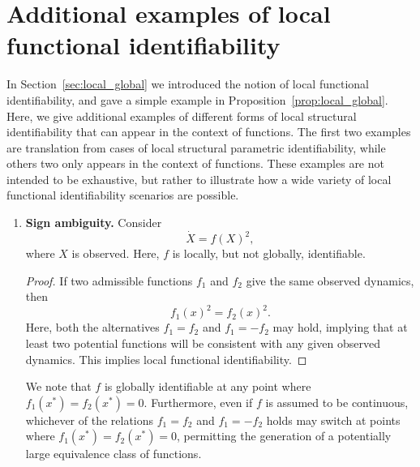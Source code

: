 \documentclass{article}
\theoremstyle{plain}
\theoremstyle{definition}
\begin{document}
{%

\section{Additional examples of local functional identifiability} \label{appendix:local_identifiability_examples}

In Section~\ref{sec:local_global} we introduced the notion of local functional identifiability, and gave a simple example in Proposition~\ref{prop:local_global}. Here, we give additional examples of different forms of local structural identifiability that can appear in the context of functions. The first two examples are translation from cases of local structural parametric identifiability, while others two only appears in the context of functions. These examples are not intended to be exhaustive, but rather to illustrate how a wide variety of local functional identifiability scenarios are possible.

\begin{enumerate}
    \item \textbf{Sign ambiguity.} Consider
    \begin{equation*}
        \dot{X} = f(X)^2,
    \end{equation*}
    where $X$ is observed. Here, $f$ is locally, but not globally, identifiable.
    \begin{proof}[Proof]
        If two admissible functions $f_1$ and $f_2$ give the same observed dynamics, then
        \begin{equation*}
            f_1(x)^2 = f_2(x)^2.
        \end{equation*}
        Here, both the alternatives $f_1=f_2$ and $f_1=-f_2$ may hold, implying that at least two potential functions will be consistent with any given observed dynamics. This implies local functional identifiability.
    \end{proof}

    We note that $f$ is globally identifiable at any point where $f_1(x^*)=f_2(x^*)=0$. Furthermore, even if $f$ is assumed to be continuous, whichever of the relations $f_1=f_2$ and $f_1=-f_2$ holds may switch at points where $f_1(x^*)=f_2(x^*)=0$, permitting the generation of a potentially large equivalence class of functions.


\end{enumerate}}
\end{document}
